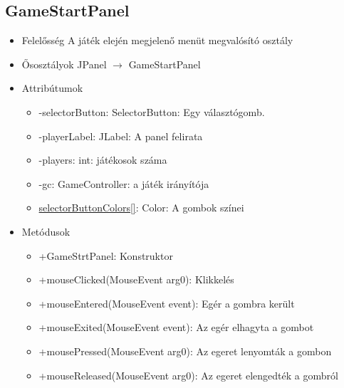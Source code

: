 \subsection{GameStartPanel}
\begin{itemize}
	\item Felelősség\newline
	A játék elején megjelenő menüt megvalósító osztály
	\item Ősosztályok\newline
	JPanel $\rightarrow$ GameStartPanel
	\item Attribútumok\newline
	\begin{itemize}
		\item -selectorButton: SelectorButton: Egy választógomb.
		\item -playerLabel: JLabel: A panel felirata
		\item -players: int: játékosok száma
		\item -gc: GameController: a játék irányítója
		\item \underline{selectorButtonColors[]}: Color: A gombok színei
	\end{itemize}
	\item Metódusok\newline
	\begin{itemize}
		\item +GameStrtPanel: Konstruktor
		\item +mouseClicked(MouseEvent arg0): Klikkelés
		\item +mouseEntered(MouseEvent event): Egér a gombra került
		\item +mouseExited(MouseEvent event): Az egér elhagyta a gombot
		\item +mousePressed(MouseEvent arg0): Az egeret lenyomták a gombon
		\item +mouseReleased(MouseEvent arg0): Az egeret elengedték a gombról
	\end{itemize}
\end{itemize}

